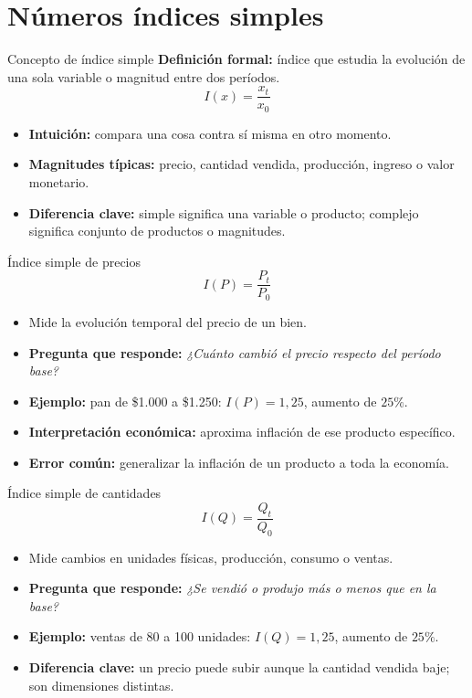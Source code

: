 \documentclass[aspectratio=169,11pt]{beamer}
\newcommand{\pregunta}[1]{\textbf{Pregunta que responde:} \emph{#1}}
\newcommand{\errorcomun}[1]{\textbf{Error común:} #1}
\newcommand{\diferencia}[1]{\textbf{Diferencia clave:} #1}
\newcommand{\intuicion}[1]{\textbf{Intuición:} #1}
\begin{document}
\section{Números índices simples}

\begin{frame}{Concepto de índice simple}
\textbf{Definición formal:} índice que estudia la evolución de una sola variable o magnitud entre dos períodos.
\[
I(x)=\frac{x_t}{x_0}
\]
\begin{itemize}
  \item \intuicion{compara una cosa contra sí misma en otro momento.}
  \item \textbf{Magnitudes típicas:} precio, cantidad vendida, producción, ingreso o valor monetario.
  \item \diferencia{simple significa una variable o producto; complejo significa conjunto de productos o magnitudes.}
\end{itemize}
\end{frame}

\begin{frame}{Índice simple de precios}
\[
I(P)=\frac{P_t}{P_0}
\]
\begin{itemize}
  \item Mide la evolución temporal del precio de un bien.
  \item \pregunta{¿Cuánto cambió el precio respecto del período base?}
  \item \textbf{Ejemplo:} pan de \$1.000 a \$1.250: $I(P)=1{,}25$, aumento de $25\%$.
  \item \textbf{Interpretación económica:} aproxima inflación de ese producto específico.
  \item \errorcomun{generalizar la inflación de un producto a toda la economía.}
\end{itemize}
\end{frame}

\begin{frame}{Índice simple de cantidades}
\[
I(Q)=\frac{Q_t}{Q_0}
\]
\begin{itemize}
  \item Mide cambios en unidades físicas, producción, consumo o ventas.
  \item \pregunta{¿Se vendió o produjo más o menos que en la base?}
  \item \textbf{Ejemplo:} ventas de 80 a 100 unidades: $I(Q)=1{,}25$, aumento de $25\%$.
  \item \diferencia{un precio puede subir aunque la cantidad vendida baje; son dimensiones distintas.}
\end{itemize}
\end{frame}
\end{document}
